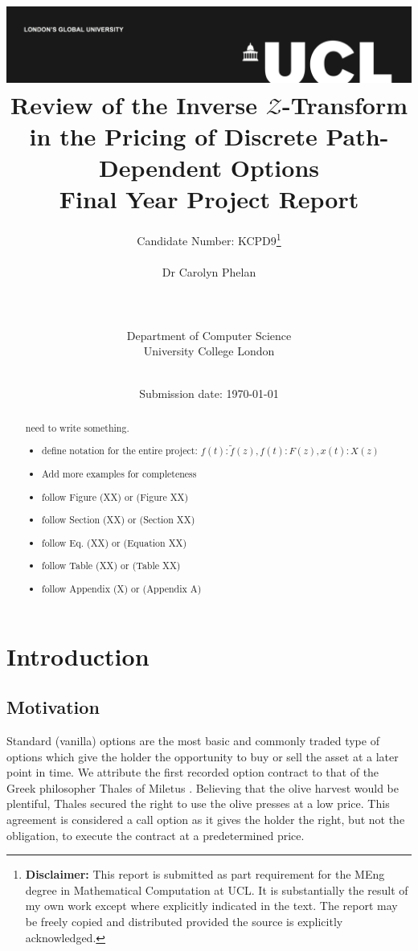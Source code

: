 \documentclass[a4paper]{report}
\title{{\vspace{-14em} \includegraphics[scale=0.4]{Logos/ucl_logo.png}}\\
{{\vspace{2em} \Huge Review of the Inverse $\mathcal{Z}$-Transform in the Pricing of Discrete Path-Dependent Options}}\\
{\large Final Year Project Report}\\
}
\date{Submission date: \today}
\author{Candidate Number: KCPD9\thanks{
{\bf Disclaimer:}
This report is submitted as part requirement for the MEng degree in Mathematical Computation at UCL. It is substantially the result of my own work except where explicitly indicated in the text. The report may be freely copied and distributed provided the source is explicitly acknowledged.}
\\ \\ Dr Carolyn Phelan
\\ \\ \\ \\ Department of Computer Science
\\ University College London
\\ \\
}
\begin{document}
\onehalfspacing
\maketitle

\renewcommand{\abstractname}{Acknowledgements}
\begin{abstract}
need to write something.
\end{abstract}

\renewcommand{\abstractname}{Abstract}
\begin{abstract}
\begin{itemize}
\item define notation for the entire project: $f(t) : \tilde{f}(z), f(t) : F(z), x(t) : X(z)$
\item Add more examples for completeness
\item follow Figure (XX) or (Figure XX)	
\item follow Section (XX) or (Section XX)
\item follow Eq. (XX) or (Equation XX)
\item follow Table (XX) or (Table XX)
\item follow Appendix (X) or (Appendix A)
\end{itemize}

\end{abstract}

\tableofcontents
\setcounter{page}{1}

\chapter{Introduction}
\section{Motivation}
Standard (vanilla) options are the most basic and commonly traded type of options which give the holder the opportunity to buy or sell the asset at a later point in time. We attribute the first recorded option contract to that of the Greek philosopher Thales of Miletus \citep{thompson1994aristotle}. Believing that the olive harvest would be plentiful, Thales secured the right to use the olive presses at a low price. This agreement is considered a call option as it gives the holder the right, but not the obligation, to execute the contract at a predetermined price.
\end{document}
